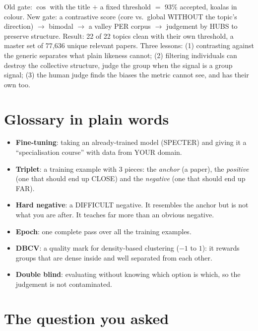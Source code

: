 \documentclass[11pt,a4paper]{article}
\begin{document}
\begin{resumen}
Old gate: $\cos$ with the title $+$ a fixed threshold $=$ 93\% accepted, koalas in colour.
New gate: a contrastive score (core vs.\ global WITHOUT the topic's direction) $\to$ bimodal
$\to$ a valley PER corpus $\to$ judgement by HUBS to preserve structure. Result: 22 of 22
topics clean with their own threshold, a master set of 77,636 unique relevant papers. Three
lessons: (1) contrasting against the generic separates what plain likeness cannot; (2) filtering
individuals can destroy the collective structure, judge the group when the signal is a group
signal; (3) the human judge finds the biases the metric cannot see, and has their own too.
\end{resumen}
\clearpage
{}
{}

\section{Glossary in plain words}

\begin{itemize}
  \item \textbf{Fine-tuning}: taking an already-trained model (SPECTER) and giving it a
        ``specialisation course'' with data from YOUR domain.
  \item \textbf{Triplet}: a training example with 3 pieces: the \emph{anchor} (a paper), the
        \emph{positive} (one that should end up CLOSE) and the \emph{negative} (one that should
        end up FAR).
  \item \textbf{Hard negative}: a DIFFICULT negative. It resembles the anchor but is not what
        you are after. It teaches far more than an obvious negative.
  \item \textbf{Epoch}: one complete pass over all the training examples.
  \item \textbf{DBCV}: a quality mark for density-based clustering ($-1$ to $1$): it rewards
        groups that are dense inside and well separated from each other.
  \item \textbf{Double blind}: evaluating without knowing which option is which, so the
        judgement is not contaminated.
\end{itemize}

\section{The question you asked}
\end{document}
